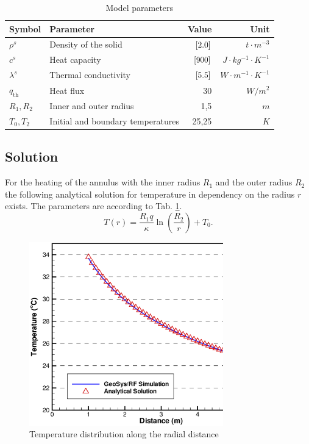 \begin{table}[htb]
\caption{\label{tab11}Model parameters}
\begin{center}
\begin{tabular}{llrr}
\toprule
Symbol & Parameter & Value & Unit \\
\midrule
$\rho^s$ & Density of the solid	& $\, \mathrm{[}2.0]{}$ & ${t \cdot m^{-3}}$ \\			
$c^s$ & Heat capacity & $\, \mathrm{[}900]{}$ & ${J \cdot kg^{-1} \cdot K^{-1}}$ \\
$\lambda^s$	& Thermal conductivity & $\, \mathrm{[}5.5]{}$ & ${W \cdot m^{-1} \cdot K^{-1}}$ \\
\hline
$q_{\mathrm{th}}$ & Heat flux & 30 & $W/m^2$ \\
$R_1,R_2$ & Inner and outer radius & 1,5 & $m$ \\
$T_0,T_2$ & Initial and boundary temperatures & 25,25 & $K$ \\
\bottomrule
\end{tabular}
\end{center}
\end{table}

\subsection{Solution}

For the heating of the annulus with the inner radius $R_1$ and the outer radius $R_2$ the following analytical solution for temperature in dependency on the radius $r$ exists.
The parameters are according to Tab. \ref{tab11}. 
%
\begin{equation}
T(r) = \frac{R_1 q}{\kappa}\ln\left(\frac{R_2}{r}\right) + T_0.
\label{T4_eq11}
\end{equation}
%
\begin{figure}[!htbp]
\centering
\includegraphics[width=0.75\textwidth]{PART_II/T/figT2.eps}
\caption{\label{figT2}Temperature distribution along the radial distance}
\end{figure}

